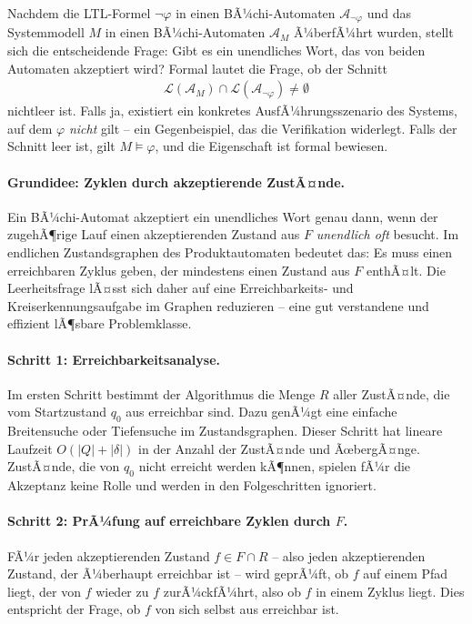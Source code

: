 ﻿\documentclass[a4paper,12pt]{article}
\theoremstyle{definition}
\begin{document}
Nachdem die LTL-Formel $\neg\varphi$ in einen BÃ¼chi-Automaten $\mathcal{A}_{\neg\varphi}$ und das Systemmodell $M$ in einen BÃ¼chi-Automaten $\mathcal{A}_M$ Ã¼berfÃ¼hrt wurden, stellt sich die entscheidende Frage: Gibt es ein unendliches Wort, das von beiden Automaten akzeptiert wird? Formal lautet die Frage, ob der Schnitt
\begin{align}
  \mathcal{L}(\mathcal{A}_M) \cap \mathcal{L}(\mathcal{A}_{\neg\varphi}) \neq \emptyset
\end{align}
nichtleer ist. Falls ja, existiert ein konkretes AusfÃ¼hrungsszenario des Systems, auf dem $\varphi$ \emph{nicht} gilt -- ein Gegenbeispiel, das die Verifikation widerlegt. Falls der Schnitt leer ist, gilt $M \models \varphi$, und die Eigenschaft ist formal bewiesen.

\paragraph*{Grundidee: Zyklen durch akzeptierende ZustÃ¤nde.}
Ein BÃ¼chi-Automat akzeptiert ein unendliches Wort genau dann, wenn der zugehÃ¶rige Lauf einen akzeptierenden Zustand aus $F$ \emph{unendlich oft} besucht. Im endlichen Zustandsgraphen des Produktautomaten bedeutet das: Es muss einen erreichbaren Zyklus geben, der mindestens einen Zustand aus $F$ enthÃ¤lt. Die Leerheitsfrage lÃ¤sst sich daher auf eine Erreichbarkeits- und Kreiserkennungsaufgabe im Graphen reduzieren -- eine gut verstandene und effizient lÃ¶sbare Problemklasse.

\paragraph*{Schritt 1: Erreichbarkeitsanalyse.}
Im ersten Schritt bestimmt der Algorithmus die Menge $R$ aller ZustÃ¤nde, die vom Startzustand $q_0$ aus erreichbar sind. Dazu genÃ¼gt eine einfache Breitensuche oder Tiefensuche im Zustandsgraphen. Dieser Schritt hat lineare Laufzeit $O(|Q| + |\delta|)$ in der Anzahl der ZustÃ¤nde und ÃœbergÃ¤nge. ZustÃ¤nde, die von $q_0$ nicht erreicht werden kÃ¶nnen, spielen fÃ¼r die Akzeptanz keine Rolle und werden in den Folgeschritten ignoriert.

\paragraph*{Schritt 2: PrÃ¼fung auf erreichbare Zyklen durch $F$.}
FÃ¼r jeden akzeptierenden Zustand $f \in F \cap R$ -- also jeden akzeptierenden Zustand, der Ã¼berhaupt erreichbar ist -- wird geprÃ¼ft, ob $f$ auf einem Pfad liegt, der von $f$ wieder zu $f$ zurÃ¼ckfÃ¼hrt, also ob $f$ in einem Zyklus liegt. Dies entspricht der Frage, ob $f$ von sich selbst aus erreichbar ist.
\end{document}
